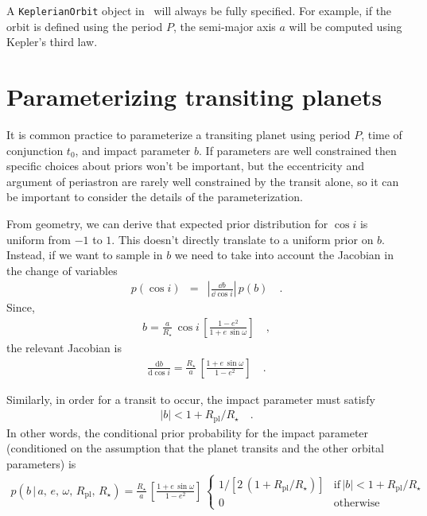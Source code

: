\documentclass[modern]{aastex62}
\begin{document}
A \texttt{KeplerianOrbit} object in \exoplanet\ will always be fully specified.
For example, if the orbit is defined using the period $P$, the semi-major axis $a$ will be computed using Kepler's third law.

\section{Parameterizing transiting planets}

It is common practice to parameterize a transiting planet using period $P$, time of conjunction $t_0$, and impact parameter $b$.
If parameters are well constrained then specific choices about priors won't be important, but the eccentricity and argument of periastron are rarely well constrained by the transit alone, so it can be important to consider the details of the parameterization.

From geometry, we can derive that expected prior distribution for $\cos i$ is uniform from $-1$ to $1$.
This doesn't directly translate to a uniform prior on $b$.
Instead, if we want to sample in $b$ we need to take into account the Jacobian in the change of variables
\begin{eqnarray}
p(\cos i) &=& \left| \frac{\dd b}{\dd \cos i} \right|\,p(b) \quad.
\end{eqnarray}
Since,
\begin{eqnarray}
b = \frac{a}{R_\star}\,\cos i\,\left[\frac{1 - e^2}{1 + e\,\sin\omega}\right]\quad,
\end{eqnarray}
the relevant Jacobian is
\begin{eqnarray}
\frac{\mathrm{d}b}{\mathrm{d}\cos i} = \frac{R_\star}{a}\,\left[\frac{1 + e\,\sin\omega}{1 - e^2}\right] \quad.
\end{eqnarray}

Similarly, in order for a transit to occur, the impact parameter must satisfy
\begin{eqnarray}
  \left|b\right| < 1 + R_\mathrm{pl}/R_\star \quad.
\end{eqnarray}
In other words, the conditional prior probability for the impact parameter (conditioned on the assumption that the planet transits and the other orbital parameters) is
\begin{eqnarray}
p(b\,|\,a,\,e,\,\omega,\,R_\mathrm{pl},\,R_\star) =
\frac{R_\star}{a}\,\left[\frac{1 + e\,\sin\omega}{1 - e^2}\right]\,
\left\{\begin{array}{ll}
  1 / [2\,(1 + R_\mathrm{pl}/R_\star)] & \mathrm{if}\,\left|b\right| < 1 + R_\mathrm{pl}/R_\star \\
  0 & \mathrm{otherwise}
\end{array}\right.
\end{eqnarray}
\end{document}
